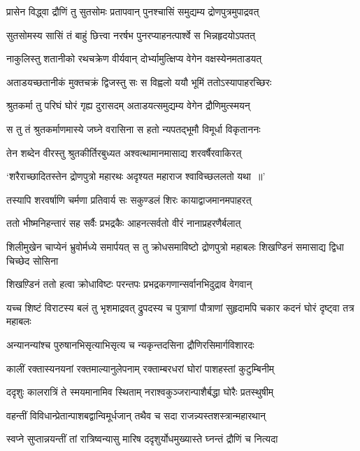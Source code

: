 \twolineshloka
{प्रासेन विद्ध्वा द्रौणिं तु सुतसोमः प्रतापवान्}
{पुनश्चासिं समुद्यम्य द्रोणपुत्रमुपाद्रवत्}


\twolineshloka
{सुतसोमस्य सासिं तं बाहुं छित्त्वा नरर्षभ}
{पुनरप्याहनत्पार्श्वे स भिन्नहृदयोऽपतत्}


\twolineshloka
{नाकुलिस्तु शतानीको रथचक्रेण वीर्यवान्}
{दोर्भ्यामुत्क्षिप्य वेगेन वक्षस्येनमताडयत्}


\twolineshloka
{अताडयच्छतानीकं मुक्तचक्रं द्विजस्तु सः}
{स विह्वलो ययौ भूमिं ततोऽस्यापाहरच्छिरः}


\twolineshloka
{श्रुतकर्मा तु परिघं घोरं गृह्य दुरासदम्}
{अताडयत्समुद्यम्य वेगेन द्रौणिमुत्स्मयन्}


\twolineshloka
{स तु तं श्रुतकर्माणमास्ये जघ्ने वरासिना}
{स हतो न्यपतद्भूमौ विमूर्धा विकृताननः}


\twolineshloka
{तेन शब्देन वीरस्तु श्रुतकीर्तिरबुध्यत}
{अश्वत्थामानमासाद्य शरवर्षैरवाकिरत्}


\twolineshloka
{`शरैराच्छादितस्तेन द्रोणपुत्रो महारथः}
{अदृश्यत महाराज श्वाविच्छललतो यथा ॥'}


\twolineshloka
{तस्यापि शरवर्षाणि चर्मणा प्रतिवार्य सः}
{सकुण्डलं शिरः कायाद्वाजमानमपाहरत्}


\twolineshloka
{ततो भीष्मनिहन्तारं सह सर्वैः प्रभद्रकैः}
{आहनत्सर्वतो वीरं नानाप्रहरणैर्बलात्}


शिलीमुखेन चाप्येनं भ्रुवोर्मध्ये समार्पयत्
\twolineshloka
{स तु क्रोधसमाविष्टो द्रोणपुत्रो महाबलः}
{शिखण्डिनं समासाद्य द्विधा चिच्छेद सोसिना}


\twolineshloka
{शिखण़्डिनं ततो हत्वा क्रोधाविष्टः परन्तपः}
{प्रभद्रकगणान्सर्वानभिदुद्राव वेगवान्}


\threelineshloka
{यच्च शिष्टं विराटस्य बलं तु भृशमाद्रवत्}
{द्रुपदस्य च पुत्राणां पौत्राणां सुहृदामपि}
{चकार कदनं घोरं दृष्ट्वा तत्र महाबलः}


\twolineshloka
{अन्यानन्यांश्च पुरुषानभिसृत्याभिसृत्य च}
{न्यकृन्तदसिना द्रौणिरसिमार्गविशारदः}


\twolineshloka
{कालीं रक्तास्यनयनां रक्तमाल्यानुलेपनाम्}
{रक्ताम्बरधरां घोरां पाशहस्तां कुटुम्बिनीम्}


\twolineshloka
{ददृशुः कालरात्रिं ते स्मयमानामिव स्थिताम्}
{नराश्वकुञ्जरान्पाशैर्बद्धा घोरैः प्रतस्थुषीम्}


\twolineshloka
{वहन्तीं विविधान्प्रेतान्पाशबद्वान्विमूर्धजान्}
{तथैव च सदा राजन्न्यस्तशस्त्रान्महारथान्}


\twolineshloka
{स्वप्ने सुप्तान्नयन्तीं तां रात्रिष्वन्यासु मारिष}
{ददृशुर्योधमुख्यास्ते घ्नन्तं द्रौणिं च नित्यदा}


